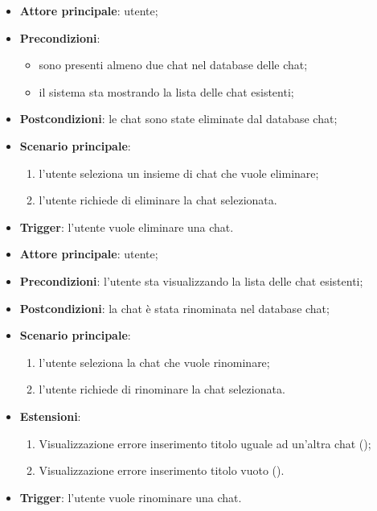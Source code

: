 \documentclass[10pt, a4paper]{article}
\begin{document}
    \begin{itemize}
        \item \textbf{Attore principale}: utente;
        \item \textbf{Precondizioni}: 
        \begin{itemize}
            \item sono presenti almeno due chat nel database delle chat;
            \item il sistema sta mostrando la lista delle chat esistenti;
        \end{itemize}
        \item \textbf{Postcondizioni}: le chat sono state eliminate dal database chat;
        \item \textbf{Scenario principale}:
        \begin{enumerate}
            \item l’utente seleziona un insieme di chat che vuole eliminare;
            \item l’utente richiede di eliminare la chat selezionata.
        \end{enumerate}
        \item \textbf{Trigger}: l’utente vuole eliminare una chat.
    \end{itemize}

    \begin{itemize}
        \item \textbf{Attore principale}: utente;
        \item \textbf{Precondizioni}: l’utente sta visualizzando la lista delle chat esistenti;
        \item \textbf{Postcondizioni}: la chat è stata rinominata nel database chat;
        \item \textbf{Scenario principale}:
        \begin{enumerate}
            \item l’utente seleziona la chat che vuole rinominare;
            \item l’utente richiede di rinominare la chat selezionata.
        \end{enumerate}
        \item \textbf{Estensioni}:
         \begin{enumerate}
            \item Visualizzazione errore inserimento titolo uguale ad un’altra chat ();
            \item Visualizzazione errore inserimento titolo vuoto ().
        \end{enumerate}
        \item \textbf{Trigger}: l’utente vuole rinominare una chat.
    \end{itemize}
\end{document}
